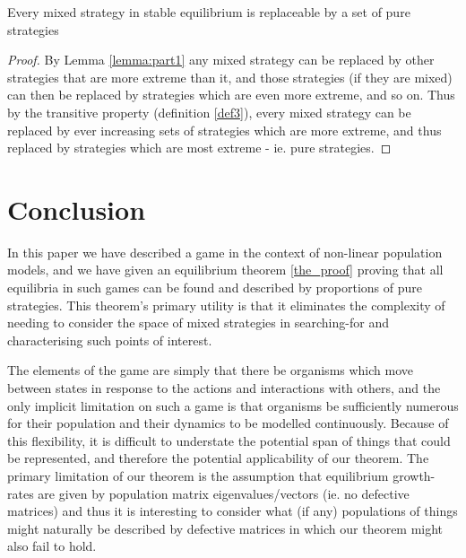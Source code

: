 \begin{Theorem}\label{the_proof}
Every mixed strategy in stable equilibrium is replaceable by a set of pure strategies 
\end{Theorem}
\begin{proof}
By Lemma \ref{lemma:part1} any mixed strategy can be replaced by other strategies that are more extreme than it, and those strategies (if they are mixed) can then be replaced by strategies which are even more extreme, and so on.
Thus by the transitive property (definition \ref{def3}), every mixed strategy can be replaced by ever increasing sets of strategies which are more extreme, and thus replaced by strategies which are most extreme - ie. pure strategies.
\end{proof}

\section{Conclusion}\label{sec:conclusion}

In this paper we have described a game in the context of non-linear population models, and we have given an equilibrium theorem \ref{the_proof} proving that all equilibria in such games can be found and described by proportions of pure strategies. This theorem's primary utility is that it eliminates the complexity of needing to consider the space of mixed strategies in searching-for and characterising such points of interest.

The elements of the game are simply that there be organisms which move between states in response to the actions and interactions with others,
and the only implicit limitation on such a game is that organisms be sufficiently numerous for their population and their dynamics to be modelled continuously.
Because of this flexibility, it is difficult to understate the potential span of things that could be represented, and therefore the potential applicability of our theorem.
The primary limitation of our theorem is the assumption that equilibrium growth-rates are given by population matrix eigenvalues/vectors (ie. no defective matrices) and thus it is interesting to consider what (if any) populations of things might naturally be described by defective matrices in which our theorem might also fail to hold.



